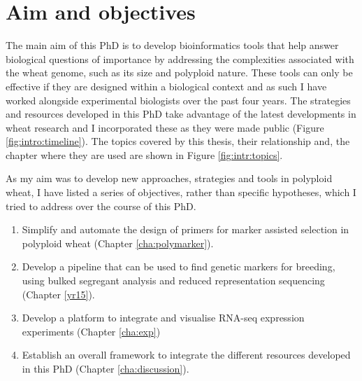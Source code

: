 

\section{Aim and objectives}


The main aim of this PhD is to develop bioinformatics tools that help answer biological questions of importance by addressing the complexities associated with the wheat genome, such as its size and polyploid nature. 
These tools can only be effective if they are designed within a biological context and as such I have worked alongside experimental biologists over the past four years. 
The strategies and resources developed in this PhD take advantage of the latest developments in wheat research and I incorporated these as they were made public (Figure \ref{fig:intro:timeline}). 
The topics covered by this thesis, their relationship and, the chapter where they are used are shown in Figure \ref{fig:intr:topics}.

As my aim was to develop new approaches, strategies and tools in polyploid wheat, I have listed a series of objectives, rather than specific hypotheses, which I tried to address over the course of this PhD. 


\begin{enumerate}

\item Simplify and automate the design of primers for marker assisted selection in polyploid wheat (Chapter \ref{cha:polymarker}).
\item Develop a pipeline that can be used to find genetic markers for breeding, using bulked segregant analysis and reduced representation sequencing  (Chapter \ref{yr15}).
\item Develop a platform to integrate and visualise RNA-seq expression experiments (Chapter \ref{cha:exp})
\item Establish an overall framework to integrate the different resources developed in this PhD (Chapter \ref{cha:discussion}).
\end{enumerate}

